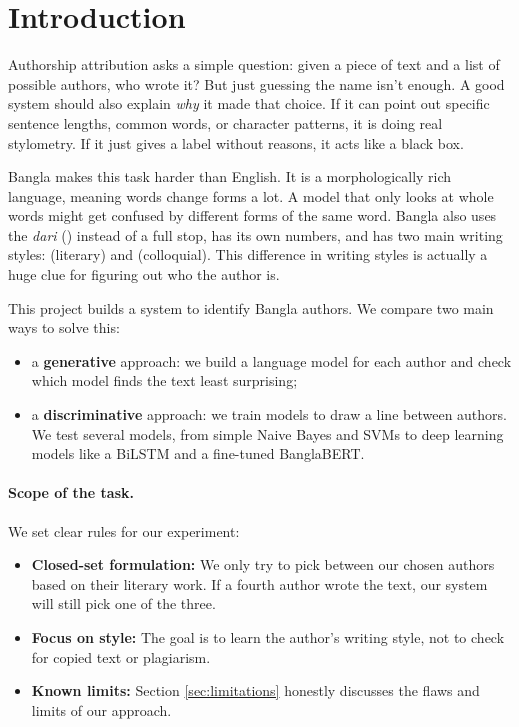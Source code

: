
\section{Introduction}

Authorship attribution asks a simple question: given a piece of text and a list of possible authors, who wrote it? But just guessing the name isn't enough. A good system should also explain \emph{why} it made that choice. If it can point out specific sentence lengths, common words, or character patterns, it is doing real stylometry. If it just gives a label without reasons, it acts like a black box.

Bangla makes this task harder than English. It is a morphologically rich language, meaning words change forms a lot. A model that only looks at whole words might get confused by different forms of the same word. Bangla also uses the \emph{dari} () instead of a full stop, has its own numbers, and has two main writing styles:  (literary) and  (colloquial). This difference in writing styles is actually a huge clue for figuring out who the author is.

This project builds a system to identify \nAuthors{} Bangla authors. We compare two main ways to solve this:

\begin{itemize}
  \item a \textbf{generative} approach: we build a language model for each author and check which model finds the text least surprising;
  \item a \textbf{discriminative} approach: we train models to draw a line between authors. We test several models, from simple Naive Bayes and SVMs to deep learning models like a BiLSTM and a fine-tuned BanglaBERT.
\end{itemize}

\paragraph{Scope of the task.}
We set clear rules for our experiment:
\begin{itemize}
  \item \textbf{Closed-set formulation:} We only try to pick between our \nAuthors{} chosen authors based on their literary work. If a fourth author wrote the text, our system will still pick one of the three.
  \item \textbf{Focus on style:} The goal is to learn the author's writing style, not to check for copied text or plagiarism.
  \item \textbf{Known limits:} Section \ref{sec:limitations} honestly discusses the flaws and limits of our approach.
\end{itemize}

